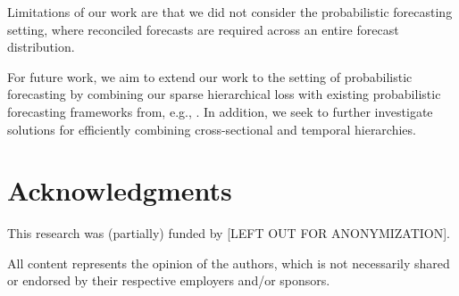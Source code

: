 \documentclass[preprint, 3p, times, twocolumn]{elsarticle}
\begin{document}
  Limitations of our work are that we did not consider the probabilistic forecasting setting, where reconciled forecasts are required across an entire forecast distribution.

  For future work, we aim to extend our work to the setting of probabilistic forecasting by combining our sparse hierarchical loss with existing probabilistic forecasting frameworks from, e.g., \cite{sprangers_probabilistic_2021, hasson_probabilistic_2021, stankeviciute_conformal_2021}. In addition, we seek to further investigate solutions for efficiently combining cross-sectional and temporal hierarchies.

\section*{Acknowledgments}
  This research was (partially) funded by [LEFT OUT FOR ANONYMIZATION].

  All content represents the opinion of the authors, which is not necessarily shared or endorsed by their respective employers and/or sponsors.
  


 


\clearpage

\appendix
\onecolumn
\end{document}
